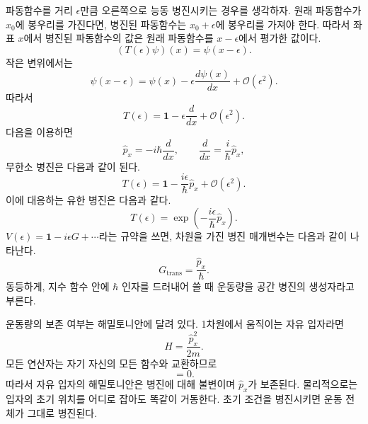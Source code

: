 파동함수를 거리 \(\epsilon\)만큼 오른쪽으로 능동 병진시키는 경우를 생각하자. 원래 파동함수가 \(x_0\)에 봉우리를 가진다면, 병진된 파동함수는 \(x_0+\epsilon\)에 봉우리를 가져야 한다. 따라서 좌표 \(x\)에서 병진된 파동함수의 값은 원래 파동함수를 \(x-\epsilon\)에서 평가한 값이다.
\begin{equation}
(T(\epsilon)\psi)(x)=\psi(x-\epsilon).
\end{equation}
작은 변위에서는
\begin{equation}
\psi(x-\epsilon)
=
\psi(x)-\epsilon\frac{d\psi(x)}{dx}
+\mathcal O(\epsilon^2).
\end{equation}
따라서
\begin{equation}
T(\epsilon)
=
\mathbf 1-\epsilon\frac{d}{dx}
+\mathcal O(\epsilon^2).
\end{equation}
다음을 이용하면
\begin{equation}
\hat p_x=-i\hbar\frac{d}{dx},
\qquad
\frac{d}{dx}=\frac{i}{\hbar}\hat p_x,
\end{equation}
무한소 병진은 다음과 같이 된다.
\begin{equation}
T(\epsilon)
=
\mathbf 1-\frac{i\epsilon}{\hbar}\hat p_x
+\mathcal O(\epsilon^2).
\end{equation}
이에 대응하는 유한 병진은 다음과 같다.
\begin{equation}
T(\epsilon)
=
\exp\left(-\frac{i\epsilon}{\hbar}\hat p_x\right).
\end{equation}
\(V(\epsilon)=\mathbf 1-i\epsilon G+\cdots\)라는 규약을 쓰면, 차원을 가진 병진 매개변수는 다음과 같이 나타난다.
\begin{equation}
G_{\mathrm{trans}}=\frac{\hat p_x}{\hbar}.
\end{equation}
동등하게, 지수 함수 안에 \(\hbar\) 인자를 드러내어 쓸 때 운동량을 공간 병진의 생성자라고 부른다.

\begin{classroomqa}
\end{classroomqa}

운동량의 보존 여부는 해밀토니안에 달려 있다. 1차원에서 움직이는 자유 입자라면
\begin{equation}
H=\frac{\hat p_x^2}{2m}.
\end{equation}
모든 연산자는 자기 자신의 모든 함수와 교환하므로
\begin{equation}
[H,\hat p_x]=0.
\end{equation}
따라서 자유 입자의 해밀토니안은 병진에 대해 불변이며 \(\hat p_x\)가 보존된다. 물리적으로는 입자의 초기 위치를 어디로 잡아도 똑같이 거동한다. 초기 조건을 병진시키면 운동 전체가 그대로 병진된다.

